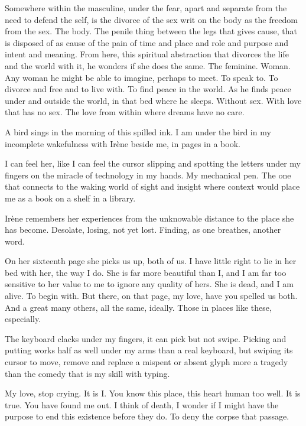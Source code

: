 ﻿Somewhere within the masculine, under the fear, apart and separate
from the need to defend the self, is the divorce of the sex writ on
the body as the freedom from the sex.  The body.  The penile thing
between the legs that gives cause, that is disposed of as cause of the
pain of time and place and role and purpose and intent and meaning.
From here, this spiritual abstraction that divorces the life and the
world with it, he wonders if she does the same.  The feminine.  Woman.
Any woman he might be able to imagine, perhaps to meet.  To speak to.
To divorce and free and to live with.  To find peace in the world.  As
he finds peace under and outside the world, in that bed where he
sleeps.  Without sex.  With love that has no sex.  The love from
within where dreams have no care.

A bird sings in the morning of this spilled ink.  I am under the bird
in my incomplete wakefulness with Ir\`{e}ne beside me, in pages in a
book.

I can feel her, like I can feel the cursor slipping and spotting the
letters under my fingers on the miracle of technology in my hands.  My
mechanical pen.  The one that connects to the waking world of sight
and insight where context would place me as a book on a shelf in a
library.

Ir\`{e}ne remembers her experiences from the unknowable distance to
the place she has become.  Desolate, losing, not yet lost.  Finding,
as one breathes, another word.

\vfill
\break

﻿On her sixteenth page she picks us up, both of us.  I have little
right to lie in her bed with her, the way I do.  She is far more
beautiful than I, and I am far too sensitive to her value to me to
ignore any quality of hers.  She is dead, and I am alive.  To begin
with.  But there, on that page, my love, have you spelled us both.
And a great many others, all the same, ideally.  Those in places like
these, especially.

The keyboard clacks under my fingers, it can pick but not swipe.
Picking and putting works half as well under my arms than a real
keyboard, but swiping its cursor to move, remove and replace a mispent
or absent glyph more a tragedy than the comedy that is my skill with
typing.

My love, stop crying.  It is I.  You know this place, this heart human
too well.  It is true.  You have found me out.  I think of death, I
wonder if I might have the purpose to end this existence before they
do.  To deny the corpse that passage.

